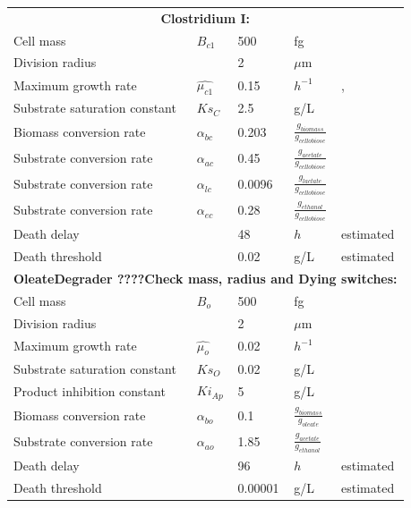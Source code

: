 \begin{table}
\begin{tabular}{|p{6cm}|p{1.2cm}|p{1.4cm}|p{1.5cm}|p{3cm}|}
		\multicolumn{5}{|c|}{\textbf{Clostridium I:}} \\
		\cline{1-5}
		Cell mass   & $ B_{c1}$&	500 & fg& \cite{kubitschek1990cell} \\ \cline{1-5}
		Division radius  & 	&2&$\mu$m &\cite{sowers1984methanosarcina}\\ \cline{1-5}
		Maximum growth rate	& $\hat{\mu_{c1}}$ & 0.15& $h^{-1}$&\cite{kubitschek1990cell}, \cite{gavala2003kinetics, ibba1991two} \\ \cline{1-5}
		Substrate saturation constant& $ Ks_{C} $ &	2.5&g/L&\cite{kalyuzhnyi1997batch, ibba1991two}  \\ \cline{1-5}
		Biomass conversion rate& $ \alpha_{bc}$	&0.203& $\frac{g_{biomass}}{g_{cellobiose}}$&\cite{ibba1991two, bhunia2008analysis}  \\ \cline{1-5}
		Substrate conversion rate&$ \alpha_{ac}$&	0.45& $\frac{g_{acetate}}{g_{cellobiose}}$&\cite{gavala2003kinetics, ibba1991two}  \\ \cline{1-5}
        Substrate conversion rate&$ \alpha_{lc}$&	0.0096& $\frac{g_{lactate}}{g_{cellobiose}}$&\cite{gavala2003kinetics, ibba1991two}  \\ \cline{1-5}
        Substrate conversion rate&$ \alpha_{ec}$&	0.28& $\frac{g_{ethanol}}{g_{cellobiose}}$&\cite{gavala2003kinetics, ibba1991two}  \\ \cline{1-5}
		Death delay&	&48 & $h$& estimated\\ \cline{1-5}
		Death threshold&	&0.02 & g/L& estimated\\ \cline{1-5}
        
        \multicolumn{5}{|c|}{\textbf{OleateDegrader ????Check mass, radius and Dying switches:}} \\
		\cline{1-5}
		Cell mass   & $ B_{o}$&	500 & fg& \cite{kubitschek1990cell} \\ \cline{1-5}
        Division radius  & 	&2&$\mu$m &\cite{}\\ \cline{1-5}
		Maximum growth rate	& $\hat{\mu_{o}}$ & 0.02& $h^{-1}$&\cite{} \\ \cline{1-5}
		Substrate saturation constant& $ Ks_{O} $ &	0.02&g/L&\cite{}  \\ \cline{1-5}
        Product inhibition constant& $ Ki_{Ap} $ &	5&g/L&\cite{}  \\ \cline{1-5}
        Biomass conversion rate& $ \alpha_{bo}$	&0.1& $\frac{g_{biomass}}{g_{oleate}}$&\cite{}  \\ \cline{1-5}
		Substrate conversion rate&$ \alpha_{ao}$&	1.85& $\frac{g_{acetate}}{g_{ethanol}}$&\cite{}  \\ \cline{1-5}
        Death delay&	&96 & $h$& estimated\\ \cline{1-5}
		Death threshold&	&0.00001 & g/L& estimated\\ \cline{1-5}
        

\end{tabular}
\end{table}
